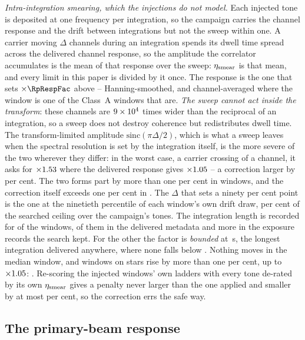 \emph{Intra-integration smearing, which the injections do not model.} Each
injected tone is deposited at one frequency per integration, so the campaign
carries the channel response and the drift between integrations but not the
sweep within one. A carrier moving $\Delta$ channels during an integration
spends its dwell time spread across the delivered channel response, so the
amplitude the correlator accumulates is the mean of that response over the
sweep: $\eta_{\rm smear}$ is that mean, and every limit in this paper is
divided by it once. The response is the one that sets $\times\RpRespFac$ above --
Hanning-smoothed, and channel-averaged where the window is one of the
\NmRespNAvgA{} Class~A windows that are. \emph{The sweep cannot act inside
the transform}: these channels are $9\times10^{4}$ times wider than the
reciprocal of an integration, so a sweep does not destroy coherence but
redistributes dwell time. The transform-limited amplitude
$\mathrm{sinc}(\pi\Delta/2)$, which is what a sweep leaves when the spectral
resolution is set by the integration itself, is the more severe of the two
wherever they differ: in the worst case, a carrier crossing
\NmRespDeltaWorst{} of a channel, it asks for $\times1.53$ where
the delivered response gives $\times1.05$ -- a correction larger by
\NmRespOverPct{} per cent. The two forms part by more than one per cent in \NmRespNPart{} windows,
and the correction itself exceeds one per cent in \NmRespNApplied.
The $\Delta$ that sets a ninety
per cent point is the one at the ninetieth percentile of each window's own
drift draw, \SmcQninePct{} per cent of the searched ceiling over the
campaign's \SmcNTone{} tones. The integration length is recorded for
\SmcNMeas{} of the \NWindows{} windows, \CsNDumpWin{} of them in the delivered
metadata and \SmNRecov{} more in the exposure records the search kept. For the
other \SmcNBound{} the factor is \emph{bounded} at \SmcDtCeil\,s, the longest
integration delivered anywhere, where none falls below \SmcBoundEta.
Nothing moves in the median window, and \SmcNAbove{} windows on
\SmcNAboveStar{} stars rise by more than one per cent, up to
$\times1.05$: \SmcAboveStars. Re-scoring the \SmcValNWin{} injected
windows' own ladders with every tone de-rated by its own $\eta_{\rm smear}$
gives a penalty never larger than the one applied and smaller by at most
\SmcValWorstPct{} per cent, so the correction errs the safe way.

\subsection{The primary-beam response}
\label{app:pbresp}


